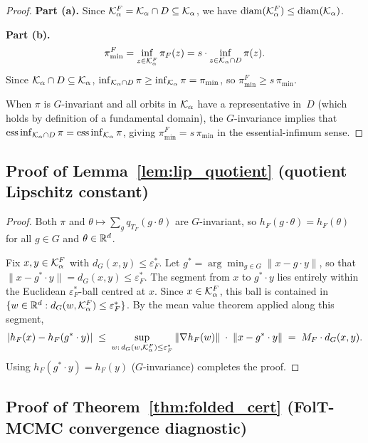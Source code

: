 \begin{proof}
  \textbf{Part (a).}
  Since $\mathcal{K}_\alpha^F = \mathcal{K}_\alpha \cap D \subseteq \mathcal{K}_\alpha$,
  we have $\mathrm{diam}(\mathcal{K}_\alpha^F) \leq \mathrm{diam}(\mathcal{K}_\alpha)$.

  \textbf{Part (b).}
  \[
    \pi_{\min}^F
    = \inf_{z \in \mathcal{K}_\alpha^F} \pi_F(z)
    = s \cdot \inf_{z \in \mathcal{K}_\alpha \cap D} \pi(z).
  \]
  Since $\mathcal{K}_\alpha \cap D \subseteq \mathcal{K}_\alpha$,
  $\inf_{\mathcal{K}_\alpha \cap D} \pi \geq \inf_{\mathcal{K}_\alpha} \pi
  = \pi_{\min}$,
  so $\pi_{\min}^F \geq s\,\pi_{\min}$.

  When $\pi$ is $G$-invariant and all orbits in $\mathcal{K}_\alpha$
  have a representative in~$D$ (which holds by definition of a
  fundamental domain), the $G$-invariance implies that
  $\operatorname{ess\,inf}_{\mathcal{K}_\alpha \cap D} \pi
  = \operatorname{ess\,inf}_{\mathcal{K}_\alpha} \pi$,
  giving $\pi_{\min}^F = s\,\pi_{\min}$ in the essential-infimum
  sense.
\end{proof}


\subsection{Proof of Lemma~\ref{lem:lip_quotient}
  (quotient Lipschitz constant)}
\label{app:proof_lip}

\begin{proof}
  Both $\pi$ and $\theta \mapsto \sum_g q_{T_F}(g \cdot \theta)$
  are $G$-invariant, so $h_F(g \cdot \theta) = h_F(\theta)$ for
  all $g \in G$ and $\theta \in \mathbb{R}^d$.

  Fix $x, y \in \mathcal{K}_\alpha^F$ with $d_G(x,y) \leq \varepsilon_F^*$.
  Let $g^* = \arg\min_{g \in G} \|x - g \cdot y\|$, so that
  $\|x - g^* \cdot y\| = d_G(x,y) \leq \varepsilon_F^*$.
  The segment from $x$ to $g^* \cdot y$ lies entirely within the
  Euclidean $\varepsilon_F^*$-ball centred at $x$.  Since
  $x \in \mathcal{K}_\alpha^F$, this ball is contained in
  $\{w \in \mathbb{R}^d : d_G(w, \mathcal{K}_\alpha^F) \leq \varepsilon_F^*\}$.
  By the mean value theorem applied along this segment,
  \[
    |h_F(x) - h_F(g^* \cdot y)|
    \;\leq\;
    \sup_{w:\, d_G(w, \mathcal{K}_\alpha^F) \leq \varepsilon_F^*}
    \|\nabla h_F(w)\|
    \;\cdot\;
    \|x - g^* \cdot y\|
    \;=\;
    M_F \cdot d_G(x, y).
  \]
  Using $h_F(g^* \cdot y) = h_F(y)$ ($G$-invariance) completes the proof.
\end{proof}


\subsection{Proof of Theorem~\ref{thm:folded_cert}
  (FolT-MCMC convergence diagnostic)}
\label{app:proof_cert}

